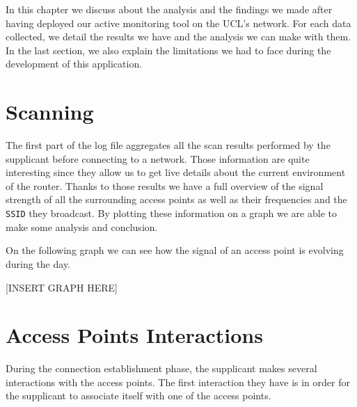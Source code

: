 In this chapter we discuss about the analysis and the findings we made after having deployed our active monitoring tool on the UCL's network. For each data collected, we detail the results we have and the analysis we can make with them. In the last section, we also explain the limitations we had to face during the development of this application.


\section{Scanning}
The first part of the log file aggregates all the scan results performed by the supplicant before connecting to a network. Those information are quite interesting since they allow us to get live details about the current environment of the router. Thanks to those results we have a full overview of the signal strength of all the surrounding access points as well as their frequencies and the \texttt{SSID} they broadcast. By plotting these information on a graph we are able to make some analysis and conclusion.

On the following graph we can see how the signal of an access point is evolving during the day. 

[INSERT GRAPH HERE]



\section{Access Points Interactions}
During the connection establishment phase, the supplicant makes several interactions with the access points. The first interaction they have is in order for the supplicant to associate itself with one of the access points. 


